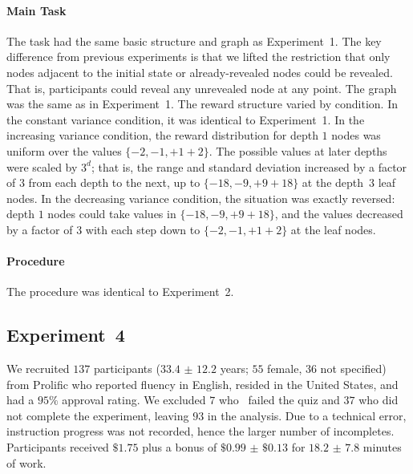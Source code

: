 \paragraph{Main Task}
The task had the same basic structure and graph as Experiment~1. The key difference from previous experiments is that we lifted the restriction that only nodes adjacent to the initial state or already-revealed nodes could be revealed. That is, participants could reveal any unrevealed node at any point. The graph was the same as in Experiment~1. The reward structure varied by condition. In the constant variance condition, it was identical to Experiment~1. In the increasing variance condition, the reward distribution for depth $1$ nodes was uniform over the values $\{-2,-1, +1 +2\}$. The possible values at later depths were scaled by $3^d$; that is, the range and standard deviation increased by a factor of $3$ from each depth to the next, up to $\{-18,-9, +9 +18\}$ at the depth~$3$ leaf nodes. In the decreasing variance condition, the situation was exactly reversed: depth $1$ nodes could take values in $\{-18,-9, +9 +18\}$, and the values decreased by a factor of $3$ with each step down to $\{-2,-1, +1 +2\}$ at the leaf nodes.

\paragraph{Procedure}
The procedure was identical to Experiment~2.


\subsection{Experiment~4}\label{sec:planning-methods4} We recruited $137$ participants ($33.4$ $\pm$ $12.2$ years; $55$ female, $36$ not specified) from Prolific who reported fluency in English, resided in the United States, and had a $95\%$ approval rating. We excluded $7$ who \ failed the quiz and $37$ who did not complete the experiment, leaving $93$ in the analysis. Due to a technical error, instruction progress was not recorded, hence the larger number of incompletes. Participants received $\$1.75$ plus a bonus of $\$0.99$ $\pm$ $\$0.13$ for $18.2$ $\pm$ $7.8$ minutes of work.

